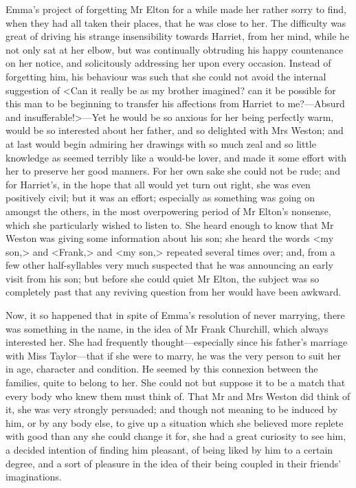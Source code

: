 Emma's project of forgetting Mr Elton for a while made her rather sorry to find, when they had all taken their places, that he was close to her. The difficulty was great of driving his strange insensibility towards Harriet, from her mind, while he not only sat at her elbow, but was continually obtruding his happy countenance on her notice, and solicitously addressing her upon every occasion. Instead of forgetting him, his behaviour was such that she could not avoid the internal suggestion of <Can it really be as my brother imagined? can it be possible for this man to be beginning to transfer his affections from Harriet to me?—Absurd and insufferable!>—Yet he would be so anxious for her being perfectly warm, would be so interested about her father, and so delighted with Mrs Weston; and at last would begin admiring her drawings with so much zeal and so little knowledge as seemed terribly like a would-be lover, and made it some effort with her to preserve her good manners. For her own sake she could not be rude; and for Harriet's, in the hope that all would yet turn out right, she was even positively civil; but it was an effort; especially as something was going on amongst the others, in the most overpowering period of Mr Elton's nonsense, which she particularly wished to listen to. She heard enough to know that Mr Weston was giving some information about his son; she heard the words <my son,> and <Frank,> and <my son,> repeated several times over; and, from a few other half-syllables very much suspected that he was announcing an early visit from his son; but before she could quiet Mr Elton, the subject was so completely past that any reviving question from her would have been awkward.

Now, it so happened that in spite of Emma's resolution of never marrying, there was something in the name, in the idea of Mr Frank Churchill, which always interested her. She had frequently thought—especially since his father's marriage with Miss Taylor—that if she were to marry, he was the very person to suit her in age, character and condition. He seemed by this connexion between the families, quite to belong to her. She could not but suppose it to be a match that every body who knew them must think of. That Mr and Mrs Weston did think of it, she was very strongly persuaded; and though not meaning to be induced by him, or by any body else, to give up a situation which she believed more replete with good than any she could change it for, she had a great curiosity to see him, a decided intention of finding him pleasant, of being liked by him to a certain degree, and a sort of pleasure in the idea of their being coupled in their friends' imaginations.

